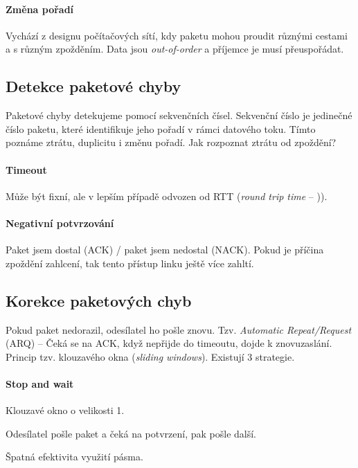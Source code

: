 \paragraph*{Změna pořadí} Vychází z designu počítačových sítí, kdy paketu mohou proudit různými cestami a s různým zpožděním. Data jsou \textit{out-of-order} a příjemce je musí přeuspořádat.

\subsection*{Detekce paketové chyby}

Paketové chyby detekujeme pomocí sekvenčních čísel. Sekvenční číslo je jedinečné číslo paketu, které identifikuje jeho pořadí v rámci datového toku. Tímto poznáme ztrátu, duplicitu i změnu pořadí. Jak rozpoznat ztrátu od zpoždění?

\paragraph*{Timeout} Může být fixní, ale v lepším případě odvozen od RTT (\textit{round trip time} -- )).

\paragraph*{Negativní potvrzování} Paket jsem dostal (ACK) / paket jsem nedostal (NACK). Pokud je příčina zpoždění zahlcení, tak tento přístup linku ještě více zahltí.

\subsection*{Korekce paketových chyb}

Pokud paket nedorazil, odesílatel ho pošle znovu. Tzv. \textit{Automatic Repeat/Request} (ARQ) -- Čeká se na ACK, když nepřijde do timeoutu, dojde k znovuzaslání. Princip tzv. klouzavého okna (\textit{sliding windows}). Existují 3 strategie.

\paragraph*{Stop and wait} \begin{compactitem}
    \item Klouzavé okno o velikosti 1.
    \item Odesílatel pošle paket a čeká na potvrzení, pak pošle další.
    \item Špatná efektivita využití pásma.
\end{compactitem}


